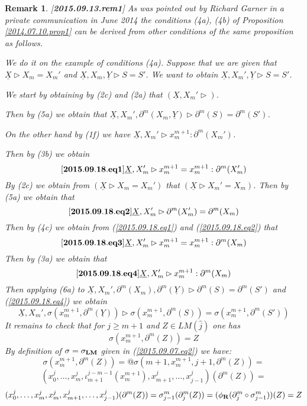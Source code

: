 \documentclass[11pt]{article}
\newenvironment{eq}{\begin{equation}}{\end{equation}}
\newtheorem{remark}[proposition]{Remark}
\newcommand{\llabel}[1]{\label{#1}[{\bf #1}]}
\newcommand{\rr}{{\bf R}}
\newcommand{\lm}{{\bf LM}}
\newcommand{\uu}{\underline}
\newcommand{\wh}{\widehat}
\begin{document}
\begin{remark}\rm
\llabel{2015.09.13.rem1}
As was pointed out by Richard Garner in a private communication in June 2014 the conditions (4a), (4b) of Proposition \ref{2014.07.10.prop1} can be derived from other conditions of the same proposition as follows.  

We do it on the example of conditions (4a). Suppose that we are given that $\uu{X}\rhd X_m=X_m'$ and $\uu{X},X_m,\uu{Y}\rhd S=S'$. We want to obtain $\uu{X},X_m',\uu{Y}\rhd S=S'$. 

We start by obtaining by (2c) and (2a) that $(\uu{X},X_m'\rhd)$. 

Then by (5a) we obtain that $\uu{X},X_m',\partial^{m}(X_m,\uu{Y})\rhd \partial^{m}(S)=\partial^{m}(S')$. 

On the other hand by (1f) we have $\uu{X},X_m'\rhd x_m^{m+1}:\partial^m(X_m')$. 

Then by  (3b) we obtain 
%
\begin{eq}\llabel{2015.09.18.eq1}
\uu{X},X_m'\rhd x_m^{m+1}=x_m^{m+1}:\partial^m(X_m')
\end{eq}
%
By (2c) we obtain from $(\uu{X}\rhd X_m=X_m')$ that $(\uu{X}\rhd X_m'=X_m)$. Then by (5a) we obtain that 
%
\begin{eq}\llabel{2015.09.18.eq2}
\uu{X},X_m'\rhd\partial^m(X_m')=\partial^m(X_m)
\end{eq}
%
Then by (4c) we obtain from (\ref{2015.09.18.eq1}) and (\ref{2015.09.18.eq2}) that
%
\begin{eq}\llabel{2015.09.18.eq3}
\uu{X},X_m'\rhd x_m^{m+1}=x_m^{m+1}:\partial^m(X_m)
\end{eq}
%
Then by (3a) we obtain that 
%
\begin{eq}\llabel{2015.09.18.eq4}
\uu{X},X_m'\rhd x_m^{m+1}:\partial^m(X_m)
\end{eq}
%
Then applying (6a) to $\uu{X},X_m',\partial^m(X_m),\partial^m(\uu{Y})\rhd \partial^{m}(S)=\partial^{m}(S')$ and (\ref{2015.09.18.eq4}) we obtain 
%
$$\uu{X},X_m',\sigma(x_m^{m+1},\partial^{m}(\uu{Y}))\rhd \sigma(x_m^{m+1},\partial^{m}(S))=\sigma(x_m^{m+1},\partial^m(S'))$$
%
It remains to check that for $j\ge m+1$ and $Z\in LM(\wh{j})$ one has
%
$$\sigma(x_m^{m+1},\partial^m(Z))=Z$$
%
By definition of $\sigma=\sigma_{\lm}$ given in (\ref{2015.09.07.eq2}) we have:
%
$$\sigma(x_m^{m+1},\partial^m(Z))=@\sigma(m+1,x_m^{m+1},j+1,\partial^m(Z))=$$
$$(x_0^j,\dots,x_m^j,\iota_{m+1}^{j-m-1}(x_{m}^{m+1}),x_{m+1}^j,\dots,x_{j-1}^j)(\partial^m(Z))=$$
$$(x_0^j,\dots,x_m^j,x_m^j,x_{m+1}^j,\dots,x_{j-1}^j)(\partial^m(Z))=\sigma^m_{j-1}(\partial^m_j(Z))=(\phi_{\rr}(\partial^m_j\circ \sigma^m_{j-1}))(Z)=Z$$
%


\end{remark}
\end{document}
